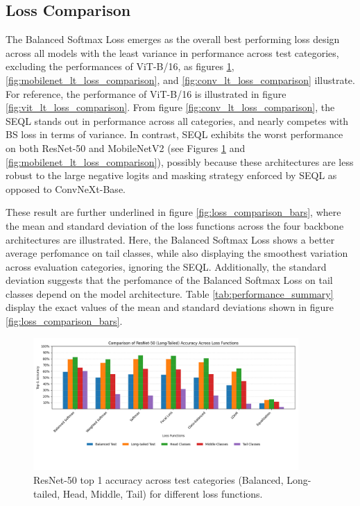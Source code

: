 \subsection{Loss Comparison}
The Balanced Softmax Loss emerges as the overall best performing loss design across all models with the least variance in performance across test categories, excluding the performances of ViT-B/16, as figures \ref{fig:resnet_lt_loss_comparison}, \ref{fig:mobilenet_lt_loss_comparison}, and \ref{fig:conv_lt_loss_comparison} illustrate. For reference, the performance of ViT-B/16 is illustrated in figure \ref{fig:vit_lt_loss_comparison}. From figure \ref{fig:conv_lt_loss_comparison}, the SEQL stands out in performance across all categories, and nearly competes with BS loss in terms of variance. In contrast, SEQL exhibits the worst performance on both ResNet-50 and MobileNetV2 (see Figures \ref{fig:resnet_lt_loss_comparison} and \ref{fig:mobilenet_lt_loss_comparison}), possibly because these architectures are less robust to the large negative logits and masking strategy enforced by SEQL as opposed to ConvNeXt-Base.

These result are further underlined in figure \ref{fig:loss_comparison_bars}, where the mean and standard deviation of the loss functions across the four backbone architectures are illustrated. Here, the Balanced Softmax Loss shows a better average perfomance on tail classes, while also displaying the smoothest variation across evaluation categories, ignoring the SEQL. Additionally, the standard deviation suggests that the perfomance of the Balanced Softmax Loss on tail classes depend on the model architecture. Table \ref{tab:performance_summary} display the exact values of the mean and standard deviations shown in figure \ref{fig:loss_comparison_bars}. 


\begin{figure}[h!]
    \centering
    \includegraphics[width=0.9\textwidth]{Images/Plots/resnet_lt_loss_comparison.png}
    \caption{ResNet-50 top 1 accuracy across test categories (Balanced, Long-tailed, Head, Middle, Tail) for different loss functions.}
    \label{fig:resnet_lt_loss_comparison}
\end{figure}
\FloatBarrier

